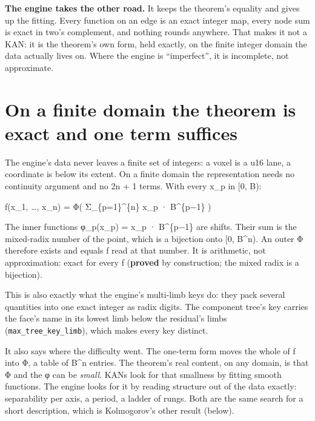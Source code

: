 \textbf{The engine takes the other road.} It keeps the theorem's equality and gives up the fitting. Every function on an edge is an exact integer map, every node sum is exact in two's complement, and nothing rounds anywhere. That makes it not a KAN: it is the theorem's own form, held exactly, on the finite integer domain the data actually lives on. Where the engine is “imperfect”, it is incomplete, not approximate.

\section{\texorpdfstring{On a finite domain the theorem is exact and one term suffices}{On a finite domain the theorem is exact and one term suffices}}

The engine's data never leaves a finite set of integers: a voxel is a u16 lane, a coordinate is below its extent. On a finite domain the representation needs no continuity argument and no 2n + 1 terms. With every x\_\allowbreak{}p in [0, B):

f(x\_\allowbreak{}1, …, x\_\allowbreak{}n) = Φ( Σ\_\allowbreak{}\{p=1\}\textasciicircum{}\{n\} x\_\allowbreak{}p · B\textasciicircum{}\{p−1\} )

The inner functions φ\_\allowbreak{}p(x\_\allowbreak{}p) = x\_\allowbreak{}p · B\textasciicircum{}\{p−1\} are shifts. Their sum is the mixed-radix number of the point, which is a bijection onto [0, B\textasciicircum{}n). An outer Φ therefore exists and equals f read at that number. It is arithmetic, not approximation: exact for every f (\textbf{proved} by construction; the mixed radix is a bijection).

This is also exactly what the engine's multi-limb keys do: they pack several quantities into one exact integer as radix digits. The component tree's key carries the face's name in its lowest limb below the residual's limbs (\texttt{max\_\allowbreak{}tree\_\allowbreak{}key\_\allowbreak{}limb}), which makes every key distinct.

It also says where the difficulty went. The one-term form moves the whole of f into Φ, a table of B\textasciicircum{}n entries. The theorem's real content, on any domain, is that Φ and the φ can be \emph{small}. KANs look for that smallness by fitting smooth functions. The engine looks for it by reading structure out of the data exactly: separability per axis, a period, a ladder of rungs. Both are the same search for a short description, which is Kolmogorov's other result (below).

